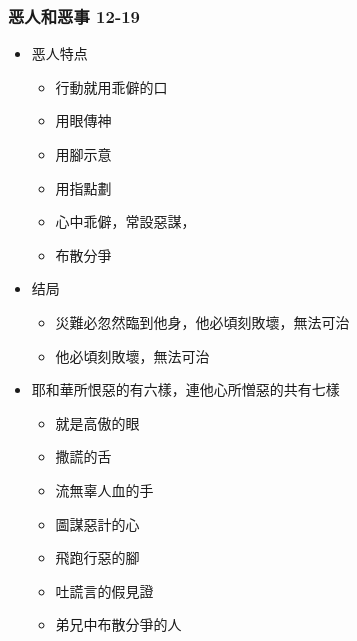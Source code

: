 \subsubsection{恶人和恶事 12-19}
\begin{itemize}
\itemsep-.45em  
\item  恶人特点
\begin{itemize}
\itemsep-.45em  
\item 行動就用乖僻的口
\item 用眼傳神
\item 用腳示意
\item 用指點劃
\item 心中乖僻，常設惡謀，
\item 布散分爭
\end{itemize}
\item 结局
\begin{itemize}
\itemsep-.45em  
\item 災難必忽然臨到他身，他必頃刻敗壞，無法可治
\item 他必頃刻敗壞，無法可治
\end{itemize}
\item 耶和華所恨惡的有六樣，連他心所憎惡的共有七樣
\begin{itemize}
\itemsep-.45em  
\item 就是高傲的眼
\item 撒謊的舌
\item 流無辜人血的手
\item 圖謀惡計的心
\item 飛跑行惡的腳
\item 吐謊言的假見證
\item 弟兄中布散分爭的人
\end{itemize}
\end{itemize}





